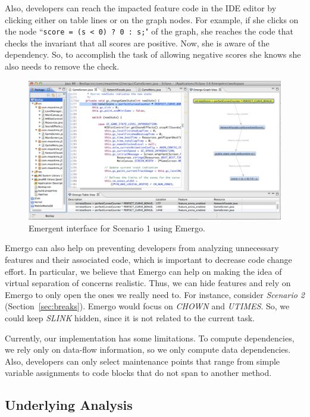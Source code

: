 Also, developers can reach the impacted feature code in the IDE editor by clicking either on table lines or on the graph nodes. For example, if she clicks on the node ``\texttt{score = (s < 0) ? 0 : s;}" of the graph, she reaches the code that checks the invariant that all scores are positive. Now, she is aware of the dependency. So, to accomplish the task of allowing negative scores she knows she also needs to remove the check.

\begin{figure}[ht]
\centering
\includegraphics[width=.9\textwidth]{images/Emergo.pdf}
\caption{Emergent interface for Scenario 1 using Emergo.}
\label{fig:emergo}
\end{figure}

Emergo can also help on preventing developers from analyzing unnecessary features and their associated code, which is important to decrease code change effort. In particular, we believe that Emergo can help on making the idea of virtual separation of concerns realistic. Thus, we can hide features and rely on Emergo to only open the ones we really need to. For instance, consider \textit{Scenario 2} (Section~\ref{sec:breaks}). Emergo would focus on \textit{CHOWN} and \textit{UTIMES}. So, we could keep \textit{SLINK} hidden, since it is not related to the current task.

Currently, our implementation has some limitations. To compute dependencies, we rely only on data-flow information, so we only compute data dependencies. Also, developers can only select maintenance points that range from simple variable assignments to code blocks that do not span to another method.


\subsection{Underlying Analysis}

